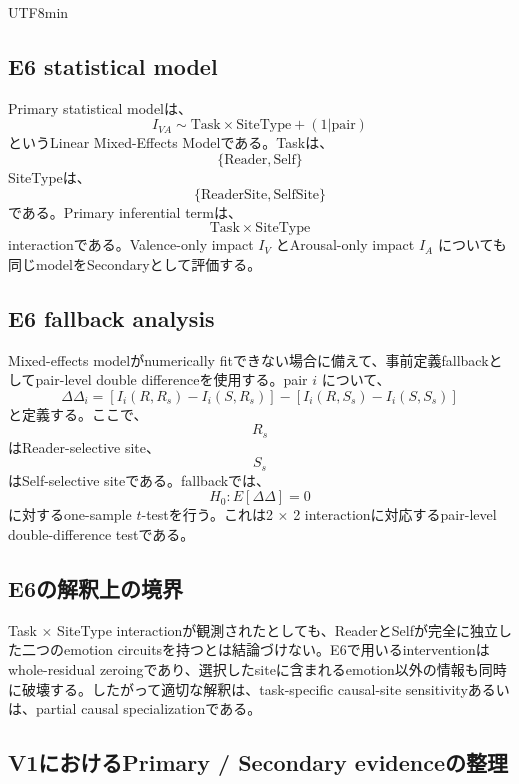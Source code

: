 \documentclass{article} %
\begin{document}
\begin{CJK*}{UTF8}{min}
\subsection{E6 statistical model}

Primary statistical modelは、
\[
I_{VA}
\sim
\mathrm{Task}
\times
\mathrm{SiteType}
+
(1|\mathrm{pair})
\]
というLinear Mixed-Effects Modelである。Taskは、
\[
\{
\text{Reader},
\text{Self}
\}
\]
SiteTypeは、
\[
\{
\text{ReaderSite},
\text{SelfSite}
\}
\]
である。Primary inferential termは、
\[
\mathrm{Task}
\times
\mathrm{SiteType}
\]
interactionである。Valence-only impact \(I_V\) とArousal-only impact \(I_A\) についても同じmodelをSecondaryとして評価する。


\subsection{E6 fallback analysis}

Mixed-effects modelがnumerically fitできない場合に備えて、事前定義fallbackとしてpair-level double differenceを使用する。pair \(i\) について、
\[
\Delta\Delta_i
=
\left[
I_i(R,R_s)
-
I_i(S,R_s)
\right]
-
\left[
I_i(R,S_s)
-
I_i(S,S_s)
\right]
\]
と定義する。ここで、
\[
R_s
\]
はReader-selective site、
\[
S_s
\]
はSelf-selective siteである。fallbackでは、
\[
H_0:
E[\Delta\Delta]=0
\]
に対するone-sample \(t\)-testを行う。これは2 \(\times\) 2 interactionに対応するpair-level double-difference testである。


\subsection{E6の解釈上の境界}

Task \(\times\) SiteType interactionが観測されたとしても、ReaderとSelfが完全に独立した二つのemotion circuitsを持つとは結論づけない。E6で用いるinterventionはwhole-residual zeroingであり、選択したsiteに含まれるemotion以外の情報も同時に破壊する。したがって適切な解釈は、task-specific causal-site sensitivityあるいは、partial causal specializationである。


\subsection{V1におけるPrimary / Secondary evidenceの整理}
\label{app:v1-primary-secondary}


\end{CJK*}
\end{document}
